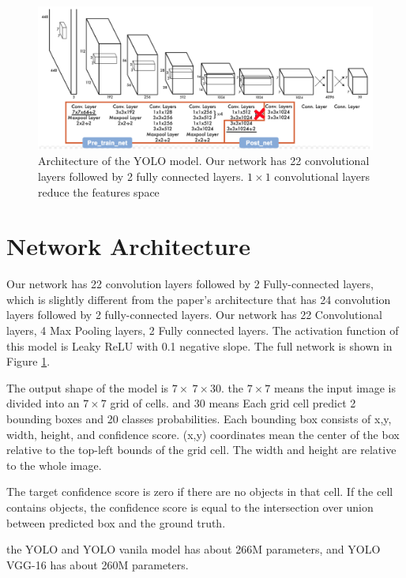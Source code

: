 \documentclass[extendedabs]{bmvc2k}
\begin{document}
\begin{figure}[t]
	\includegraphics[width=\linewidth]{images/architecture.png}
	\caption{
		Architecture of the YOLO model. Our network has 22 convolutional layers followed by 2 fully connected layers. $1\times1$ convolutional layers reduce the features space}
	\vspace{-2mm}
        \label{fig:netarch}
\end{figure}

\section{Network Architecture}
Our network has 22 convolution layers followed by 2 Fully-connected layers, which is slightly different from the paper\cite{yolopaper}'s architecture that has 24 convolution layers followed by 2 fully-connected layers. Our network has 22 Convolutional layers, 4 Max Pooling layers, 2 Fully connected layers. The activation function of this model is Leaky ReLU with 0.1 negative slope. The full network is shown in Figure \ref{fig:netarch}.
 
The output shape of the model is $7\times\ 7\times 30$. the $7\times 7$ means the input image is divided into an $7\times7$ grid of cells. and $30$ means Each grid cell predict 2 bounding boxes and 20 classes probabilities. Each bounding box consists of x,y, width, height, and confidence score. (x,y) coordinates mean the center of the box relative to the top-left bounds of the grid cell. The width and height are relative to the whole image.

The target confidence score is zero if there are no objects in that cell. If the cell contains objects, the confidence score is equal to the intersection over union between predicted box and the ground truth.

the YOLO and YOLO vanila model has about 266M parameters, and YOLO VGG-16 has about 260M parameters.
\end{document}
